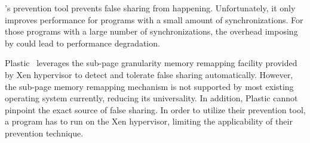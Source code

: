 \Sheriff{}'s prevention tool prevents false sharing from happening. Unfortunately, it only improves performance for programs with a small amount of synchronizations. 
For those programs with a large number of synchronizations, the overhead imposing by \Sheriff{} could lead to performance degradation.

Plastic~\cite{OSdetection} leverages the sub-page granularity memory remapping facility provided by Xen hypervisor to detect and tolerate false sharing automatically. However, the sub-page memory remapping mechanism is not supported by most existing operating system currently, reducing its universality. In addition, Plastic cannot pinpoint the exact source of false sharing.  
In order to utilize their prevention tool, a program has to run on the Xen hypervisor, limiting the applicability of their prevention technique.
